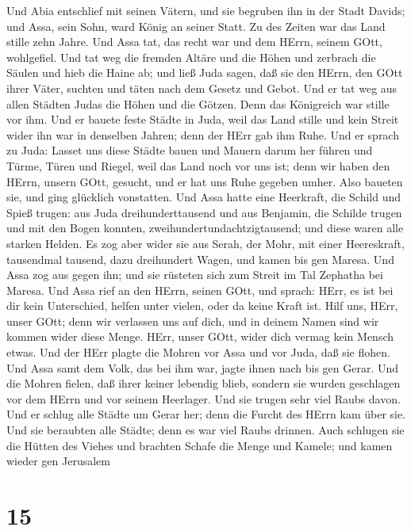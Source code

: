  Und Abia entschlief mit seinen Vätern, und sie begruben ihn
in der Stadt Davids; und Assa, sein Sohn, ward König an seiner Statt. Zu
des Zeiten war das Land stille zehn Jahre.  Und Assa tat,
das recht war und dem HErrn, seinem GOtt, wohlgefiel.  Und
tat weg die fremden Altäre und die Höhen und zerbrach die Säulen und
hieb die Haine ab;  und ließ Juda sagen, daß sie den HErrn,
den GOtt ihrer Väter, suchten und täten nach dem Gesetz und Gebot.
 Und er tat weg aus allen Städten Judas die Höhen und die
Götzen. Denn das Königreich war stille vor ihm.  Und er
bauete feste Städte in Juda, weil das Land stille und kein Streit wider
ihn war in denselben Jahren; denn der HErr gab ihm Ruhe. 
Und er sprach zu Juda: Lasset uns diese Städte bauen und Mauern darum
her führen und Türme, Türen und Riegel, weil das Land noch vor uns ist;
denn wir haben den HErrn, unsern GOtt, gesucht, und er hat uns Ruhe
gegeben umher. Also baueten sie, und ging glücklich vonstatten.
 Und Assa hatte eine Heerkraft, die Schild und Spieß trugen:
aus Juda dreihunderttausend und aus Benjamin, die Schilde trugen und mit
den Bogen konnten, zweihundertundachtzigtausend; und diese waren alle
starken Helden.  Es zog aber wider sie aus Serah, der Mohr,
mit einer Heereskraft, tausendmal tausend, dazu dreihundert Wagen, und
kamen bis gen Maresa.  Und Assa zog aus gegen ihn; und sie
rüsteten sich zum Streit im Tal Zephatha bei Maresa.  Und
Assa rief an den HErrn, seinen GOtt, und sprach: HErr, es ist bei dir
kein Unterschied, helfen unter vielen, oder da keine Kraft ist. Hilf
uns, HErr, unser GOtt; denn wir verlassen uns auf dich, und in deinem
Namen sind wir kommen wider diese Menge. HErr, unser GOtt, wider dich
vermag kein Mensch etwas.  Und der HErr plagte die Mohren
vor Assa und vor Juda, daß sie flohen.  Und Assa samt dem
Volk, das bei ihm war, jagte ihnen nach bis gen Gerar. Und die Mohren
fielen, daß ihrer keiner lebendig blieb, sondern sie wurden geschlagen
vor dem HErrn und vor seinem Heerlager. Und sie trugen sehr viel Raubs
davon.  Und er schlug alle Städte um Gerar her; denn die
Furcht des HErrn kam über sie. Und sie beraubten alle Städte; denn es
war viel Raubs drinnen.  Auch schlugen sie die Hütten des
Viehes und brachten Schafe die Menge und Kamele; und kamen wieder gen
Jerusalem

\hypertarget{section-14}{%
\section{15}\label{section-14}}

